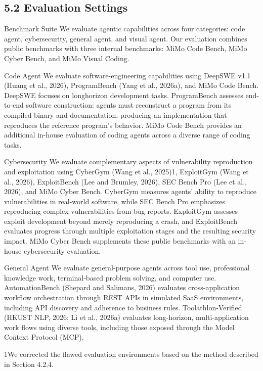 \documentclass[
  10
]{article}
\begin{document}
\subsection{5.2 Evaluation Settings}\label{evaluation-settings}

Benchmark Suite We evaluate agentic capabilities across four categories:
code agent, cybersecurity, general agent, and visual agent. Our
evaluation combines public benchmarks with three internal benchmarks:
MiMo Code Bench, MiMo Cyber Bench, and MiMo Visual Coding.

Code Agent We evaluate software-engineering capabilities using DeepSWE
v1.1 (Huang et al., 2026), ProgramBench (Yang et al., 2026a), and MiMo
Code Bench. DeepSWE focuses on longhorizon development tasks.
ProgramBench assesses end-to-end software construction: agents must
reconstruct a program from its compiled binary and documentation,
producing an implementation that reproduces the reference program's
behavior. MiMo Code Bench provides an additional in-house evaluation of
coding agents across a diverse range of coding tasks.

Cybersecurity We evaluate complementary aspects of vulnerability
reproduction and exploitation using CyberGym (Wang et al., 2025)1,
ExploitGym (Wang et al., 2026), ExploitBench (Lee and Brumley, 2026),
SEC Bench Pro (Lee et al., 2026), and MiMo Cyber Bench. CyberGym
measures agents' ability to reproduce vulnerabilities in real-world
software, while SEC Bench Pro emphasizes reproducing complex
vulnerabilities from bug reports. ExploitGym assesses exploit
development beyond merely reproducing a crash, and ExploitBench
evaluates progress through multiple exploitation stages and the
resulting security impact. MiMo Cyber Bench supplements these public
benchmarks with an in-house cybersecurity evaluation.

General Agent We evaluate general-purpose agents across tool use,
professional knowledge work, terminal-based problem solving, and
computer use. AutomationBench (Shepard and Salimans, 2026) evaluates
cross-application workflow orchestration through REST APIs in simulated
SaaS environments, including API discovery and adherence to business
rules. Toolathlon-Verified (HKUST NLP, 2026; Li et al., 2026a) evaluates
long-horizon, multi-application work flows using diverse tools,
including those exposed through the Model Context Protocol (MCP).

1We corrected the flawed evaluation environments based on the method
described in Section 4.2.4.
\end{document}
